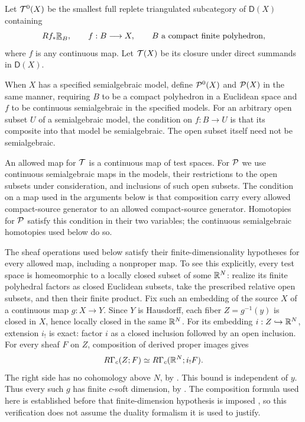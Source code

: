 \begin{definition}
\label{def:test-categories}
Let $\mathcal T^0(X)$ be the smallest full replete triangulated subcategory of
$\mathsf D(X)$ containing
\begin{equation}
 \label{cat:generators}
 Rf_*\underline{\mathbb R}_{B},
 \qquad f:B\longrightarrow X,
 \qquad B\text{ a compact finite polyhedron},
\end{equation}
where $f$ is any continuous map.  Let $\mathcal T(X)$ be its closure under direct
summands in $\mathsf D(X)$.

When $X$ has a specified semialgebraic model, define $\mathcal P^0(X)$ and
$\mathcal P(X)$ in the same manner, requiring $B$ to be a compact polyhedron in
a Euclidean space and $f$ to be continuous semialgebraic in the specified
models.  For an arbitrary open subset $U$ of a semialgebraic model, the
condition on $f:B\to U$ is that its composite into that model be
semialgebraic.  The open subset itself need not be semialgebraic.

An allowed map for $\mathcal T$ is a continuous map of test spaces.  For $\mathcal P$ we
use continuous semialgebraic maps in the models, their restrictions to the
open subsets under consideration, and inclusions of such open subsets.
The condition on a map used in the arguments below is
that composition carry every allowed compact-source generator to an
allowed compact-source generator.  Homotopies for $\mathcal P$ satisfy this
condition in their two variables; the continuous semialgebraic homotopies
used below do so.
\end{definition}

The sheaf operations used below satisfy their finite-dimensionality
hypotheses for every allowed map, including a nonproper map.  To see
this explicitly, every test space is homeomorphic to a locally closed
subset of some $\mathbb R^N$: realize its finite polyhedral factors as closed
Euclidean subsets, take the prescribed relative open subsets, and
then their finite product.  Fix such an embedding of the source $X$
of a continuous map $g:X\to Y$.  Since $Y$ is Hausdorff, each fiber
$Z=g^{-1}(y)$ is closed in $X$, hence locally closed in the same $\mathbb R^N$.
For its embedding $i:Z\hookrightarrow\mathbb R^N$, extension $i_!$ is exact:
factor $i$ as a closed inclusion followed by an open inclusion.
For every sheaf $F$ on $Z$, composition of derived proper images gives
\[
 R\Gamma_c(Z;F)\simeq R\Gamma_c(\mathbb R^N;i_!F).
\]
The right side has no cohomology above $N$, by
\cite[Lemma~11.7.1]{SchapiraNotes}.  This bound is independent of $y$.
Thus every such $g$ has finite $c$-soft dimension, by
\cite[Definition~11.3.1 and Remark~11.3.3]{SchapiraNotes}.
The composition formula used here is established before that
finite-dimension hypothesis is imposed
\cite[Equation~(11.3.1)]{SchapiraNotes}, so this verification does
not assume the duality formalism it is used to justify.

